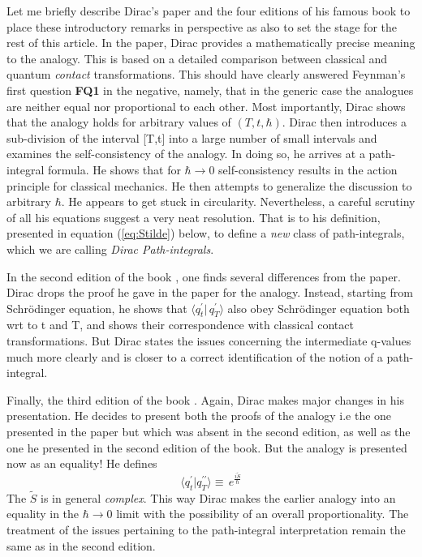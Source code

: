 \documentclass[12pt]{article}
\newcommand{\be}{\begin{equation}}
\newcommand{\ee}{\end{equation}}
\begin{document}
Let me briefly describe Dirac's paper \cite{diracpaper} and the four editions of his famous book 
\cite{diracbook1,diracbook2,diracbook3,diracbook4,diracbook4r} to place these introductory remarks in perspective as also
to set the stage for the rest of this article. In the paper, Dirac provides a mathematically precise meaning to the analogy. This is 
based on a detailed comparison between classical and quantum {\it contact} transformations. This should have clearly answered Feynman's first 
question {\bf FQ1} in the negative, namely, that in the generic case the analogues are neither equal nor proportional to each other. 
Most importantly,
Dirac shows that the analogy holds for arbitrary values of $(T,t,\hbar)$. Dirac then introduces a sub-division of the interval [T,t] into a
large number of small intervals and examines the self-consistency of the analogy. In doing so, he arrives at a path-integral formula. He
shows that for $\hbar \rightarrow 0$ self-consistency results in the action principle for classical mechanics. He then attempts to generalize
the discussion to arbitrary $\hbar$. He appears to get 
stuck in circularity. Nevertheless, a careful scrutiny of all his equations suggest a very neat resolution. That is to his definition, 
presented in equation (\ref{eq:Stilde}) below, to define a \emph{new} class of path-integrals, which we are calling {\it Dirac Path-integrals}.

In the second edition of the book \cite{diracbook2}, one finds several differences from the paper. Dirac drops the proof he gave in 
the paper for the analogy.
Instead, starting from Schr\"odinger equation, he shows that $\langle q_t^\prime|\,q_T^\prime\rangle$ also obey Schr\"odinger equation
both wrt to t and T, and shows their
correspondence with classical contact transformations. 
But Dirac states the issues concerning the intermediate 
q-values much more clearly and is closer to a correct identification of the notion of a path-integral.

Finally, the third edition of the book \cite{diracbook3}. Again, Dirac makes major changes in his presentation. He decides to present 
both the proofs of the analogy i.e the one presented in the paper but which was absent in the second edition, as well as the one he 
presented in the second edition of the book. But the analogy is presented now as an equality! He defines
\be
\label{eq:Stilde}
\langle q^\prime_t|q^{\prime\prime}_T\rangle 
\equiv\,e^{\frac{i {\tilde S}}{\hbar}}
\ee
The ${\tilde S}$ is in general \emph{complex}.
This way Dirac makes the earlier analogy into an equality in the $\hbar \rightarrow 0$ limit with the possibility of an overall 
proportionality. The treatment of the issues pertaining to the path-integral interpretation remain the same as in the second edition. 
\end{document}
